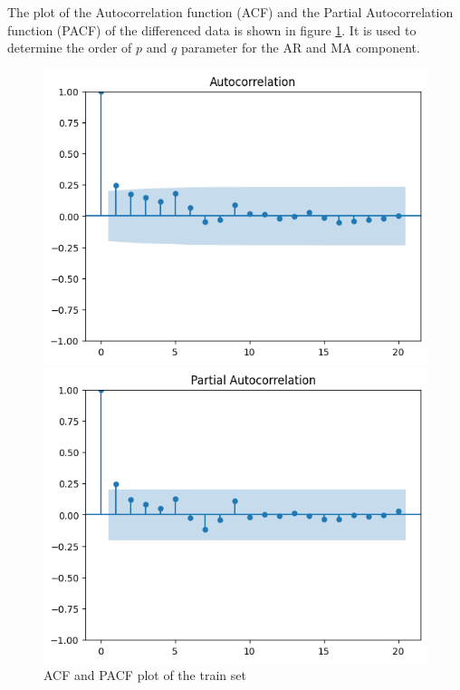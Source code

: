 \documentclass[11pt]{article}
\begin{document}
The plot of the Autocorrelation function (ACF) and the Partial Autocorrelation function (PACF) of the differenced data is shown in figure \ref{acf_pacf}. It is used to determine the order of $p$ and $q$ parameter for the AR and MA component. 

\begin{figure}[h]
    \caption{ACF and PACF plot of the train set}
    \centering
    \begin{minipage}{0.48\textwidth}
        \centering
        \includegraphics[width=\linewidth]{acf.png}
    \end{minipage}
    \hfill
    \begin{minipage}{0.48\textwidth}
        \centering
        \includegraphics[width=\linewidth]{pacf.png}
    \end{minipage}
    \label{acf_pacf}
\end{figure}
\end{document}
